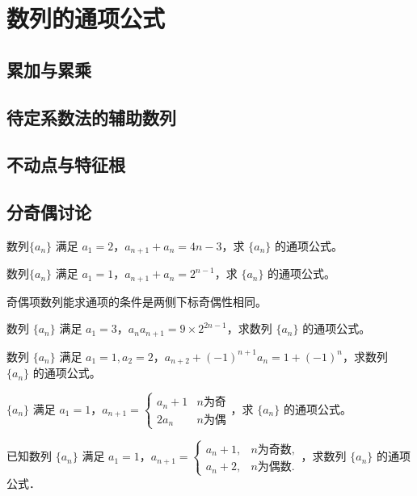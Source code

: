 \section{数列的通项公式}
\subsection{累加与累乘}
\clearpage
\subsection{待定系数法的辅助数列}
\clearpage
\subsection{不动点与特征根}
\clearpage
\subsection{分奇偶讨论}
\begin{example}
    数列\(\{a_n\}\) 满足 \(a_1 = 2\)，\(a_{n+1} + a_n = 4n - 3\)，求 \(\{a_n\}\) 的通项公式。
\end{example}
\begin{exercise}
    数列\(\{a_n\}\) 满足 \(a_1 = 1\)，\(a_{n+1} + a_n = 2^{n-1}\)，求 \(\{a_n\}\) 的通项公式。
\end{exercise}

奇偶项数列能求通项的条件是两侧下标奇偶性相同。

\begin{example}
数列 \(\{a_n\}\) 满足 \(a_1 = 3\)，\(a_n a_{n+1} = 9 \times 2^{2n-1}\)，求数列 \(\{a_n\}\) 的通项公式。
\end{example}

\begin{example}
    数列 \(\{a_n\}\) 满足 \(a_1=1, a_2 = 2\)，\(a_{n+2} + (-1)^{n+1} a_n = 1 + (-1)^n\)，求数列 \(\{a_n\}\) 的通项公式。
\end{example}

\begin{example}
    \(\{a_n\}\) 满足 \(a_1 = 1\)，\(a_{n+1} = \begin{cases} 
        a_n + 1 & n \text{为奇} \\
        2a_n & n \text{为偶}
        \end{cases}\)，求 \(\{a_n\}\) 的通项公式。
\end{example}
\begin{exercise}
    已知数列 \(\{a_n\}\) 满足 \(a_1 = 1\)，\(a_{n+1} = 
\begin{cases} 
a_n + 1, & n \text{为奇数}, \\
a_n + 2, & n \text{为偶数}.
\end{cases}\)，求数列 \(\{a_n\}\) 的通项公式．

\end{exercise}

